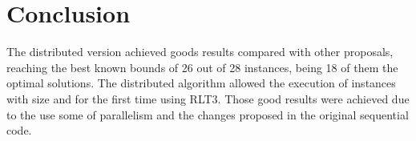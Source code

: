 \documentclass[authoryear,12pt,a4paper,times]{elsarticle}
\begin{document}
\section{Conclusion} \label{sec:conclusao}

The distributed version achieved goods results compared with other proposals, reaching the best known bounds of 26 out of 28 instances, 
being  18 of them the optimal solutions.
The distributed algorithm allowed the execution of instances with size  and  for the first time using RLT3. Those good results were achieved due to the use some of parallelism and the changes proposed in the original sequential code.



\end{document}
